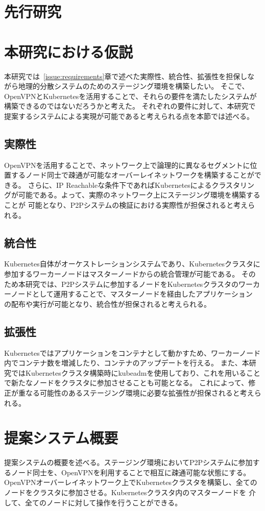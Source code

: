 \section{先行研究}

\section{本研究における仮説}
本研究では~\ref{issue:requirements}章で述べた実際性、統合性、拡張性を担保しながら地理的分散システムのためのステージング環境を構築したい。
そこで、OpenVPNとKubernetesを活用することで、それらの要件を満たしたシステムが構築できるのではないだろうかと考えた。
それぞれの要件に対して、本研究で提案するシステムによる実現が可能であると考えられる点を本節では述べる。

\subsection{実際性}
OpenVPNを活用することで、ネットワーク上で論理的に異なるセグメントに位置するノード同士で疎通が可能なオーバーレイネットワークを構築することができる。
さらに、IP Reachableな条件下であればKubernetesによるクラスタリングが可能である。よって、実際のネットワーク上にステージング環境を構築することが
可能となり、P2Pシステムの検証における実際性が担保されると考えられる。

\subsection{統合性}
Kubernetes自体がオーケストレーションシステムであり、Kubernetesクラスタに参加するワーカーノードはマスターノードからの統合管理が可能である。
そのため本研究では、P2Pシステムに参加するノードをKubernetesクラスタのワーカーノードとして運用することで、マスターノードを経由したアプリケーション
の配布や実行が可能となり、統合性が担保されると考えられる。

\subsection{拡張性}
Kubernetesではアプリケーションをコンテナとして動かすため、ワーカーノード内でコンテナ数を増減したり、コンテナのアップデートを行える。
また、本研究ではKubernetesクラスタ構築時にkubeadmを使用しており、これを用いることで新たなノードをクラスタに参加させることも可能となる。
これによって、修正が重なる可能性のあるステージング環境に必要な拡張性が担保されると考えられる。

\section{提案システム概要}
提案システムの概要を述べる。ステージング環境においてP2Pシステムに参加するノード同士を、OpenVPNを利用することで相互に疎通可能な状態にする。
OpenVPNオーバーレイネットワーク上でKubernetesクラスタを構築し、全てのノードをクラスタに参加させる。Kubernetesクラスタ内のマスターノードを
介して、全てのノードに対して操作を行うことができる。

